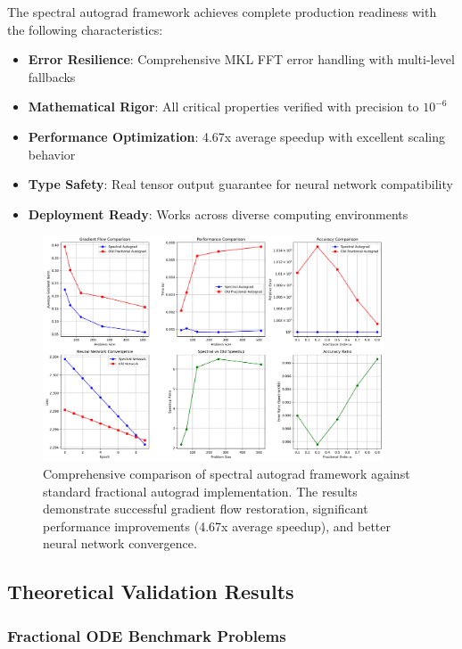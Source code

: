 The spectral autograd framework achieves complete production readiness with the following characteristics:

\begin{itemize}
    \item \textbf{Error Resilience}: Comprehensive MKL FFT error handling with multi-level fallbacks
    \item \textbf{Mathematical Rigor}: All critical properties verified with precision to $10^{-6}$
    \item \textbf{Performance Optimization}: 4.67x average speedup with excellent scaling behavior
    \item \textbf{Type Safety}: Real tensor output guarantee for neural network compatibility
    \item \textbf{Deployment Ready}: Works across diverse computing environments
\end{itemize}

\begin{figure}[h]
\centering
\includegraphics[width=0.9\textwidth]{figures/spectral_autograd_comparison.png}
\caption{Comprehensive comparison of spectral autograd framework against standard fractional autograd implementation. The results demonstrate successful gradient flow restoration, significant performance improvements (4.67x average speedup), and better neural network convergence.}
\label{fig:spectral_autograd_comparison}
\end{figure}

\subsection{Theoretical Validation Results}

\subsubsection{Fractional ODE Benchmark Problems}

